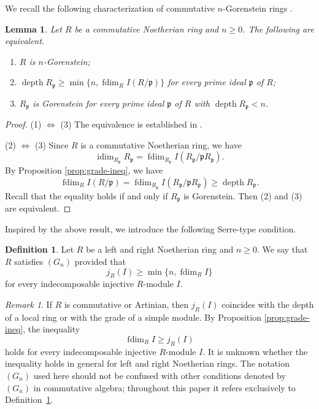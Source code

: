 \documentclass[a4paper,reqno]{amsart}
\numberwithin{equation}{section}
\theoremstyle{plain}
\newtheorem{lem}[thm]{Lemma}
\theoremstyle{definition}
\newtheorem{defn}{Definition}[section]
\theoremstyle{remark}
\newtheorem{rmk}{Remark}[section]
\DeclareMathOperator{\depth}{depth}
\DeclareMathOperator{\idim}{idim}
\DeclareMathOperator{\fdim}{fdim}
\newcommand{\fkp}{\mathfrak{p}}
\renewcommand{\-}{\mbox{-}}
\begin{document}
We recall the following characterization of commutative \(n\)-Gorenstein rings \cite{RF72}.


\begin{lem} 
    Let \(R\) be a commutative Noetherian ring and \(n \ge 0\). 
    The following are equivalent.
    \begin{enumerate}
        \item \(R\) is \(n\)-Gorenstein;
        \item \(\depth R_\fkp\ge \min\{n,\fdim_{R}I(R/\fkp)\}\) 
        for every prime ideal \(\fkp\) of \(R\);
        \item  \(R_\fkp\) is Gorenstein for every prime ideal 
        \(\fkp\) of \(R\) with \(\depth R_\fkp<n\).
    \end{enumerate}
\end{lem}


\begin{proof}
(1) \(\iff\) (3) 
The equivalence is established in \cite{RF72}.

(2) \(\iff\) (3)
Since \(R\) is a commutative Noetherian ring, we have
\begin{equation*}
    \idim_{R_{\fkp}}R_{\fkp}
    =\fdim_{R_\fkp}I(R_\fkp/\fkp R_\fkp).
\end{equation*}
By Proposition \ref{prop:grade-ineq}, we have 
\begin{equation*}
    \fdim_RI(R/\fkp)=\fdim_{R_\fkp}I(R_\fkp/\fkp R_\fkp)
    \ge\depth R_\fkp.
\end{equation*}
Recall that the equality holds if and only if \(R_{\fkp}\) is Gorenstein.
Then (2) and (3) are equivalent.
\end{proof}




Inspired by the above result, we introduce the following Serre-type condition.



\begin{defn}\label{def:serre-condition}
    Let \(R\) be a left and right Noetherian ring and \(n \ge 0\).
    We say that \(R\)  satisfies {\((G_n)\)} provided that
    \begin{equation*}
        j_R(I)\ge \min\{n,\fdim_RI\}
    \end{equation*} 
    for every indecomposable injective \(R\)-module \(I\). 
\end{defn}


\begin{rmk}
    If \(R\) is commutative or Artinian, 
    then \(j_R(I)\) coincides with the depth of a local ring 
    or  with the grade of a simple module.
    By Proposition \ref{prop:grade-ineq}, 
    the inequality 
    \[\fdim_RI\ge j_R(I)\] 
    holds for every indecomposable injective \(R\)-module \(I\).
    It is unknown whether the inequality holds in general 
    for left and right Noetherian rings.
    The notation $(G_n)$ used here should not be confused with other
    conditions denoted by $(G_n)$ in commutative algebra; throughout this paper
    it refers exclusively to Definition~\ref{def:serre-condition}.
\end{rmk}
\end{document}
